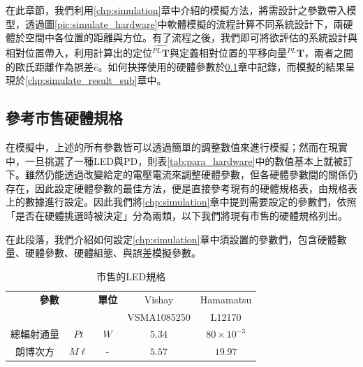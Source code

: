 在此章節，我們利用\ref{chp:simulation}章中介紹的模擬方法，將需設計之參數帶入模型，透過圖\ref{pic:simulate_hardware}中軟體模擬的流程計算不同系統設計下，兩硬體於空間中各位置的距離與方位。有了流程之後，我們即可將欲評估的系統設計與相對位置帶入，利用計算出的定位$\hat{^{PL}\boldsymbol{T}}$與定義相對位置的平移向量$^{PL}\boldsymbol{T}$，兩者之間的歐氏距離作為誤差$\hat{e}$。如何抉擇使用的硬體參數於\ref{chp:simulate_para}章中記錄，而模擬的結果呈現於\ref{chp:simulate_result_sub}章中。





















\subsection{參考市售硬體規格}
\label{chp:simulate_para}

在模擬中，上述的所有參數皆可以透過簡單的調整數值來進行模擬；然而在現實中，一旦挑選了一種LED與PD，則表\ref{tab:para_hardware}中的數值基本上就被訂下。雖然仍能透過改變給定的電壓電流來調整硬體參數，但各硬體參數間的關係仍存在，因此設定硬體參數的最佳方法，便是直接參考現有的硬體規格表，由規格表上的數據進行設定。因此我們將\ref{chp:simulation}章中提到需要設定的參數們，依照「是否在硬體挑選時被決定」分為兩類，以下我們將現有市售的硬體規格列出。



在此段落，我們介紹如何設定\ref{chp:simulation}章中須設置的參數們，包含硬體數量、硬體參數、硬體組態、與誤差模擬參數。



\begin{table}[h]
    \renewcommand{\arraystretch}{1.3}
    \setlength{\arrayrulewidth}{0.15mm}
    \setlength{\doublerulesep}{0.12mm}
    \caption{市售的LED規格}
    \label{tab:para_LED}
    \centering
    \begin{tabular}{|cc|c|| c|c|}
    \hline
    \multicolumn{2}{|c|}{\textbf{參數}} & \textbf{單位}  
    & {Vishay}
    &{Hamamatsu} \\
    \multicolumn{2}{|c|}{} & {}  
    & {VSMA1085250\cite{datasheet:led_vsma}}
    &{L12170\cite{datasheet:hm_L12170}} \\
    \hline
    總輻射通量 &$Pt$ & $W$ & $5.34$ &$80\times 10^{-3}$ \\
    朗博次方& $M\ell$& -  & $5.57$ & $19.97$\\\hline
    \end{tabular}
    \end{table}

